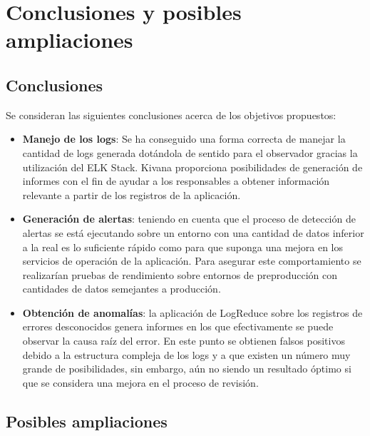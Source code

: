 \chapter{Conclusiones y posibles ampliaciones}

\section{Conclusiones}

Se consideran las siguientes conclusiones acerca de los objetivos propuestos:

\begin{itemize}

\item \textbf{Manejo de los logs}: Se ha conseguido una forma correcta de manejar la cantidad de logs generada dotándola de sentido para el observador gracias la utilización del ELK Stack. Kivana proporciona posibilidades de generación de informes con el fin de ayudar a los responsables a obtener información relevante a partir de los registros de la aplicación.

\item \textbf{Generación de alertas}: teniendo en cuenta que el proceso de detección de alertas se está ejecutando sobre un entorno con una cantidad de datos inferior a la real es lo suficiente rápido como para que suponga una mejora en los servicios de operación de la aplicación. Para asegurar este comportamiento se realizarían pruebas de rendimiento sobre entornos de preproducción con cantidades de datos semejantes a producción.

\item \textbf{Obtención de anomalías}: la aplicación de LogReduce sobre los registros de errores desconocidos genera informes en los que efectivamente se puede observar la causa raíz del error. En este punto se obtienen falsos positivos debido a la estructura compleja de los logs y a que existen un número muy grande de posibilidades, sin embargo, aún no siendo un resultado óptimo si que se considera una mejora en el proceso de revisión.

\end{itemize}


\section{Posibles ampliaciones}

